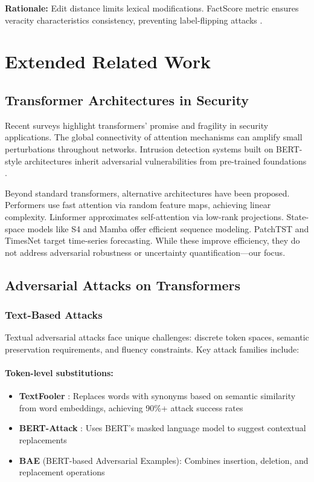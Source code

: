 \documentclass[12pt,a4paper]{article}
\theoremstyle{definition}
\begin{document}
\textbf{Rationale:} Edit distance limits lexical modifications. FactScore metric ensures veracity characteristics consistency, preventing label-flipping attacks \citep{wang2017liar}.

\section{Extended Related Work}
\label{app:related_work}

\subsection{Transformer Architectures in Security}

Recent surveys \citep{kheddar2024transformers,xu2024large} highlight transformers' promise and fragility in security applications. The global connectivity of attention mechanisms can amplify small perturbations throughout networks. Intrusion detection systems built on BERT-style architectures inherit adversarial vulnerabilities from pre-trained foundations \citep{ali2024empowering}.

Beyond standard transformers, alternative architectures have been proposed. Performers \citep{choromanski2020performer} use fast attention via random feature maps, achieving linear complexity. Linformer \citep{wang2020linformer} approximates self-attention via low-rank projections. State-space models like S4 \citep{gu2022s4} and Mamba \citep{gu2023mamba} offer efficient sequence modeling. PatchTST \citep{nie2023patchtst} and TimesNet \citep{wu2023timesnet} target time-series forecasting. While these improve efficiency, they do not address adversarial robustness or uncertainty quantification—our focus.

\subsection{Adversarial Attacks on Transformers}

\subsubsection{Text-Based Attacks}

Textual adversarial attacks face unique challenges: discrete token spaces, semantic preservation requirements, and fluency constraints. Key attack families include:

\paragraph{Token-level substitutions:}
\begin{itemize}
\item \textbf{TextFooler} \citep{jin2020bert}: Replaces words with synonyms based on semantic similarity from word embeddings, achieving 90\%+ attack success rates
\item \textbf{BERT-Attack} \citep{li2020bert}: Uses BERT's masked language model to suggest contextual replacements
\item \textbf{BAE} (BERT-based Adversarial Examples): Combines insertion, deletion, and replacement operations
\end{itemize}
\end{document}

